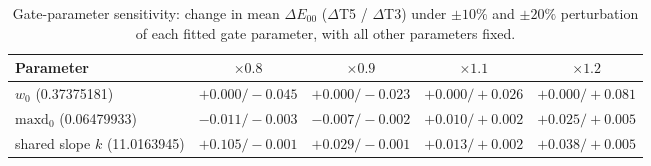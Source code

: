 \begin{table}[t]
\centering
\small
\caption{Gate-parameter sensitivity: change in mean $\Delta E_{00}$ ($\Delta$T5 / $\Delta$T3) under $\pm10\%$ and $\pm20\%$ perturbation of each fitted gate parameter, with all other parameters fixed.}
\label{tab:sensitivity}
\begin{tabular}{lcccc}
\toprule
Parameter & $\times0.8$ & $\times0.9$ & $\times1.1$ & $\times1.2$ \\
\midrule
$w_{0}$ (0.37375181) & $+0.000/-0.045$ & $+0.000/-0.023$ & $+0.000/+0.026$ & $+0.000/+0.081$ \\
$\mathrm{maxd}_{0}$ (0.06479933) & $-0.011/-0.003$ & $-0.007/-0.002$ & $+0.010/+0.002$ & $+0.025/+0.005$ \\
shared slope $k$ (11.0163945) & $+0.105/-0.001$ & $+0.029/-0.001$ & $+0.013/+0.002$ & $+0.038/+0.005$ \\
\bottomrule
\end{tabular}
\end{table}

